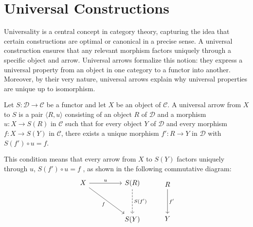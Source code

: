\section{\centering Universal Constructions}
Universality is a central concept in category theory, capturing the idea that certain
constructions are optimal or canonical in a precise sense. A universal construction
ensures that any relevant morphism factors uniquely through a specific object and
arrow. Universal arrows formalize this notion: they express a universal property
from an object in one category to a functor into another. Moreover, by their very
nature, universal arrows explain why universal properties are unique up to
isomorphism.
\begin{definition}
  \label{def:universalarrow}
  Let $S : \mathcal{D} \to \mathcal{C}$ be a functor and let $X$ be an object
  of $\mathcal{C}$. A universal arrow from $X$ to $S$ is a pair
  $\langle R, u \rangle$ consisting of an object $R$ of $\mathcal{D}$ and a morphism
  $u : X \to S(R)$ in $\mathcal{C}$ such that for every object $Y$ of
  $\mathcal{D}$ and every morphism $f : X \to S(Y)$ in $\mathcal{C}$,
  there exists a unique morphism $f' : R \to Y$ in $\mathcal{D}$ with
  $S(f') \circ u = f$.
\end{definition}
This condition means that every arrow from $X$ to $S(Y)$ factors uniquely
through $u$,   \(
S(f') \circ u = f
\)
, as shown in the following commutative diagram:
\[
  \begin{tikzcd}[row sep=huge, column sep=huge]
    X \arrow[r, "u"] \arrow[dr, "f"'] & S(R) \arrow[d, dashed, "S(f')"] \\
    & S(Y)
  \end{tikzcd}
  \qquad
  \begin{tikzcd}[row sep=huge, column sep=huge]
    R \arrow[d, "f'" ] \\
    Y
  \end{tikzcd}
\]
